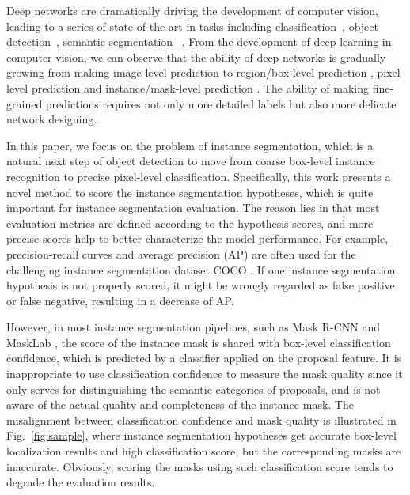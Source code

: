 \documentclass[10pt,twocolumn,letterpaper]{article}
\begin{document}
    Deep networks are dramatically driving the development of computer vision, leading to a series of state-of-the-art in tasks including classification~\cite{krizhevsky2012imagenet, he2016deepresnet,tang2017deep}, object detection~\cite{girshick2014rich, huang2015densebox, redmon2016youyolo, liu2016ssd, ren2015faster, tang2018object}, semantic segmentation~\cite{long2015fully, chen2018deeplab, zhao2017pyramidpspnet,huang2018ccnet} \etc. 
    From the development of deep learning in computer vision, we can observe that the ability of deep networks is gradually growing 
    from making image-level prediction \cite{krizhevsky2012imagenet} to region/box-level prediction \cite{girshick2014rich}, pixel-level prediction \cite{long2015fully} and instance/mask-level prediction \cite{he2017maskrcnn}. The ability of making fine-grained predictions requires not only more detailed labels but also more delicate network designing. 
    
    In this paper, we focus on the problem of instance segmentation, which is a natural next step of object detection to move from coarse box-level instance recognition to precise pixel-level classification. 
Specifically, this work presents a novel method to score the instance segmentation hypotheses, which is quite important for instance segmentation evaluation. The reason lies in that most evaluation metrics are defined according to the hypothesis scores, and more precise scores help to better characterize the model performance. 
    For example, precision-recall curves and average precision (AP) are often used for the challenging instance segmentation dataset COCO \cite{lin2014microsoftcoco}. If one instance segmentation hypothesis is not properly scored, it might be wrongly regarded as false positive or false negative, resulting in a decrease of AP.
    




    However, in most instance segmentation pipelines, such as Mask R-CNN \cite{he2017maskrcnn} and MaskLab \cite{chen2017masklab}, the score of the instance mask is shared with box-level classification confidence, which is predicted by a classifier applied on the proposal feature. 
It is inappropriate to use classification confidence to measure the mask quality since it only serves for distinguishing the semantic categories of proposals, and is not aware of the actual quality and completeness of the instance mask.
    The misalignment between classification confidence and mask quality is illustrated in Fig.~\ref{fig:sample}, 
where instance segmentation hypotheses get accurate box-level localization results and high classification score, but the corresponding masks are inaccurate. Obviously, scoring the masks using such classification score tends to degrade the evaluation results.
    
\end{document}
